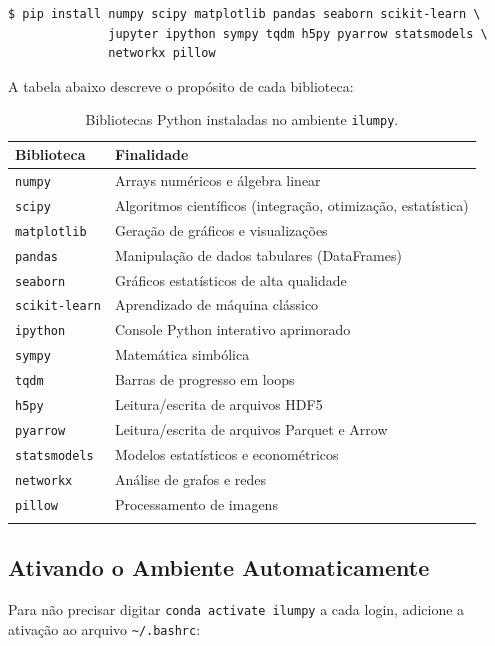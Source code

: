 \documentclass[11pt, a4paper]{article}
\newcommand{\cmd}[1]{\texttt{\textcolor{codeblue}{#1}}}
\begin{document}
\begin{lstlisting}[style=terminal]
$ pip install numpy scipy matplotlib pandas seaborn scikit-learn \
              jupyter ipython sympy tqdm h5py pyarrow statsmodels \
              networkx pillow
\end{lstlisting}

A tabela abaixo descreve o propósito de cada biblioteca:

\begin{longtable}{ll}
  \toprule
  \textbf{Biblioteca} & \textbf{Finalidade} \\
  \midrule
  \endhead
  \texttt{numpy} & Arrays numéricos e álgebra linear \\
  \texttt{scipy} & Algoritmos científicos (integração, otimização, estatística) \\
  \texttt{matplotlib} & Geração de gráficos e visualizações \\
  \texttt{pandas} & Manipulação de dados tabulares (DataFrames) \\
  \texttt{seaborn} & Gráficos estatísticos de alta qualidade \\
  \texttt{scikit-learn} & Aprendizado de máquina clássico \\
  \texttt{ipython} & Console Python interativo aprimorado \\
  \texttt{sympy} & Matemática simbólica \\
  \texttt{tqdm} & Barras de progresso em loops \\
  \texttt{h5py} & Leitura/escrita de arquivos HDF5 \\
  \texttt{pyarrow} & Leitura/escrita de arquivos Parquet e Arrow \\
  \texttt{statsmodels} & Modelos estatísticos e econométricos \\
  \texttt{networkx} & Análise de grafos e redes \\
  \texttt{pillow} & Processamento de imagens \\
  \bottomrule
  \caption{Bibliotecas Python instaladas no ambiente \texttt{ilumpy}.}
\end{longtable}

\subsection{Ativando o Ambiente Automaticamente}

Para não precisar digitar \cmd{conda activate ilumpy} a cada login, adicione
a ativação ao arquivo \texttt{\textasciitilde/.bashrc}:
\end{document}
